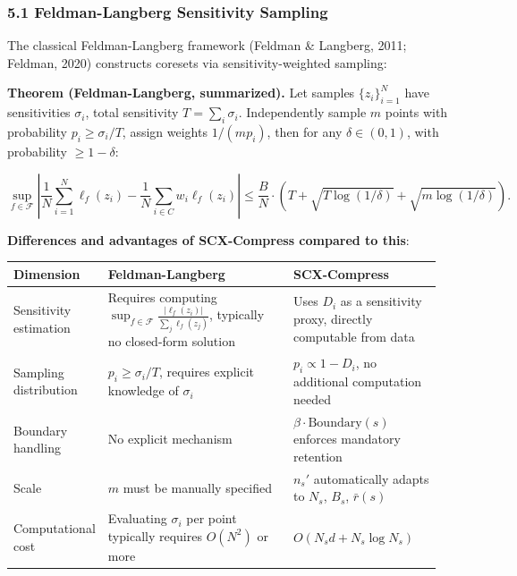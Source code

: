 \documentclass[
  12pt,
]{article}
\begin{document}
\subsubsection{5.1 Feldman-Langberg Sensitivity Sampling}\label{feldman-langberg}

The classical Feldman-Langberg framework (Feldman \& Langberg, 2011; Feldman, 2020)
constructs coresets via sensitivity-weighted sampling:

\textbf{Theorem (Feldman-Langberg, summarized).} Let samples \(\{z_i\}_{i=1}^N\)
have sensitivities \(\sigma_i\), total sensitivity \(T = \sum_i \sigma_i\). Independently sample \(m\) points with probability
\(p_i \geq \sigma_i / T\), assign weights
\(1/(m p_i)\), then for any \(\delta \in (0,1)\), with probability \(\geq 1-\delta\):

\[
\sup_{f \in \mathcal{F}} \left| \frac{1}{N} \sum_{i=1}^N \ell_f(z_i) - \frac{1}{N} \sum_{i \in C} w_i \ell_f(z_i) \right|
\leq \frac{B}{N} \cdot \left( T + \sqrt{T \log(1/\delta)} + \sqrt{m \log(1/\delta)} \right).
\]

\textbf{Differences and advantages of SCX-Compress compared to this}:

\begin{longtable}[]{@{}p{0.15\linewidth}p{0.45\linewidth}p{0.35\linewidth}@{}}
\toprule\noalign{}
\begin{minipage}[b]{\linewidth}\raggedright
Dimension
\end{minipage} & \begin{minipage}[b]{\linewidth}\raggedright
Feldman-Langberg
\end{minipage} & \begin{minipage}[b]{\linewidth}\raggedright
SCX-Compress
\end{minipage} \\
\midrule\noalign{}
\endhead
\bottomrule\noalign{}
\endlastfoot
Sensitivity estimation & Requires computing
\(\sup_{f \in \mathcal{F}} \frac{|\ell_f(z_i)|}{\sum_j \ell_f(z_j)}\), typically no closed-form solution
& Uses \(D_i\) as a sensitivity proxy, directly computable from data \\
Sampling distribution & \(p_i \geq \sigma_i/T\), requires explicit knowledge of \(\sigma_i\) &
\(p_i \propto 1 - D_i\), no additional computation needed \\
Boundary handling & No explicit mechanism & \(\beta \cdot \text{Boundary}(s)\) enforces mandatory retention \\
Scale & \(m\) must be manually specified & \(n_s'\) automatically adapts to
\(N_s\), \(B_s\), \(\bar{r}(s)\) \\
Computational cost & Evaluating \(\sigma_i\) per point typically requires \(O(N^2)\) or more &
\(O(N_s d + N_s \log N_s)\) \\
\end{longtable}
\end{document}
